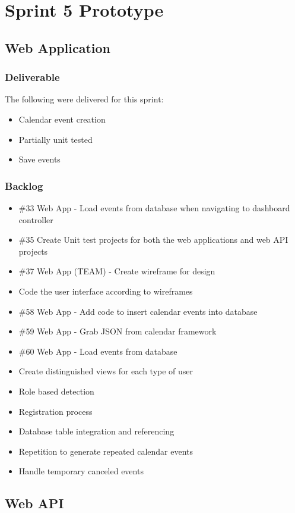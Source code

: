 \section{Sprint 5 Prototype}
\subsection{Web Application}

\subsubsection{Deliverable}
The following were delivered for this sprint:
\begin{itemize}
\item Calendar event creation
\item Partially unit tested
\item Save events
\end{itemize}
\subsubsection{Backlog}
\begin{itemize}
\item \#33 Web App - Load events from database when navigating to dashboard controller
\item \#35 Create Unit test projects for both the web applications and web API projects
\item \#37 Web App (TEAM) - Create wireframe for design
\item Code the user interface according to wireframes
\item \#58 Web App - Add code to insert calendar events into database
\item \#59 Web App - Grab JSON from calendar framework
\item \#60 Web App - Load events from database
\item Create distinguished views for each type of user
\item Role based detection
\item Registration process
\item Database table integration and referencing
\item Repetition to generate repeated calendar events
\item Handle temporary canceled events
\end{itemize}

\subsection{Web API}
